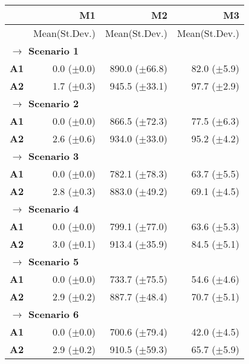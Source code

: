\begin{tabular}{rrrr} \hline
		& \bf{M1}
        & \bf{M2}
		& \bf{M3} \\  \hline 
		
		& Mean(St.Dev.)  & Mean(St.Dev.) & Mean(St.Dev.)\\ [1ex]
		
		\multicolumn{3}{l}{\textbf{$\longrightarrow$ Scenario 1 }} \\
\bf{A1}  & 0.0 ($\pm$0.0)  & 890.0 ($\pm$66.8)  & 82.0 ($\pm$5.9)  \\
\bf{A2}  & 1.7 ($\pm$0.3)  & 945.5 ($\pm$33.1)  & 97.7 ($\pm$2.9)  \\ [1ex]
	
	\multicolumn{3}{l}{\textbf{$\longrightarrow$ Scenario 2 }} \\
\bf{A1}  & 0.0 ($\pm$0.0)  & 866.5 ($\pm$72.3)  & 77.5 ($\pm$6.3) \\
\bf{A2}  & 2.6 ($\pm$0.6)  & 934.0 ($\pm$33.0)  & 95.2 ($\pm$4.2) \\ [1ex]
	
	\multicolumn{3}{l}{\textbf{$\longrightarrow$ Scenario 3 }} \\
\bf{A1}  & 0.0 ($\pm$0.0)  & 782.1 ($\pm$78.3)  & 63.7 ($\pm$5.5) \\
\bf{A2}  & 2.8 ($\pm$0.3)  & 883.0 ($\pm$49.2)  & 69.1 ($\pm$4.5) \\ [1ex]
	
	\multicolumn{3}{l}{\textbf{$\longrightarrow$ Scenario 4 }} \\
\bf{A1}  & 0.0 ($\pm$0.0)  & 799.1 ($\pm$77.0)  & 63.6 ($\pm$5.3) \\
\bf{A2}  & 3.0 ($\pm$0.1)  & 913.4 ($\pm$35.9)  & 84.5 ($\pm$5.1) \\ [1ex]
	
	\multicolumn{3}{l}{\textbf{$\longrightarrow$ Scenario 5 }} \\
\bf{A1}  & 0.0 ($\pm$0.0)  & 733.7 ($\pm$75.5)  & 54.6 ($\pm$4.6)  \\
\bf{A2}  & 2.9 ($\pm$0.2)  & 887.7 ($\pm$48.4)  & 70.7 ($\pm$5.1) \\ [1ex]
	
	\multicolumn{3}{l}{\textbf{$\longrightarrow$ Scenario 6 }} \\
\bf{A1}  & 0.0 ($\pm$0.0)  & 700.6 ($\pm$79.4)  & 42.0 ($\pm$4.5) \\
\bf{A2}  & 2.9 ($\pm$0.2)  & 910.5 ($\pm$59.3)  & 65.7 ($\pm$5.9) \\ [1ex]
	

\end{tabular}
